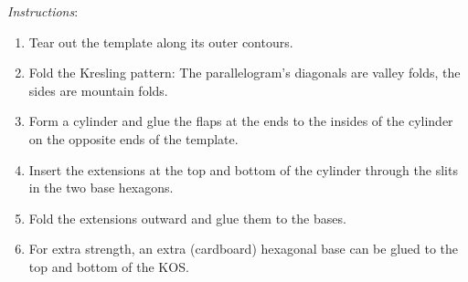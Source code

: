\emph{Instructions}:\\[-.5em]
\begin{enumerate}
    \item Tear out the template along its outer contours.
    \item Fold the Kresling pattern: The parallelogram's diagonals are valley folds, the sides are mountain folds.
    \item Form a cylinder and glue the flaps at the ends to the insides of the cylinder on the opposite ends of the template.
    \item Insert the extensions at the top and bottom of the cylinder through the slits in the two base hexagons.
    \item Fold the extensions outward and glue them to the bases.
    \item For extra strength, an extra (cardboard) hexagonal base can be glued to the top and bottom of the KOS.
\end{enumerate}

